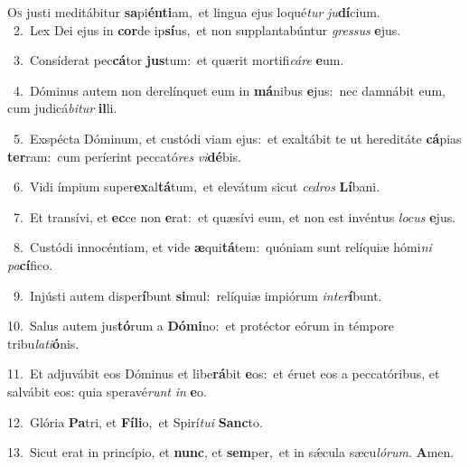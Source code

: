 \lettrine{\initial\textcolor{\initialcolor}{O}}{s} justi meditábitur \textbf{sa}\-pi\-\textbf{én}\-\textbf{ti}am,~\star et lingua ejus loqué\textit{tur} \textit{ju}\-\textbf{dí}cium.\\
{\numbfont\textcolor{\numbcolor}{~2.}}~Lex Dei ejus in \textbf{cor}\-de ip\-\textbf{sí}\-us,~\star et non supplantabúntur \textit{gres}\-\textit{sus} \textbf{e}\-jus.\par
{\numbfont\textcolor{\numbcolor}{~3.}}~Consíderat pec\-\textbf{cá}\-tor \textbf{jus}\-tum:~\star et quærit mortifi\-\textit{cá}\-\textit{re} \textbf{e}\-um.\par
{\numbfont\textcolor{\numbcolor}{~4.}}~Dóminus autem non derelínquet eum in \textbf{má}\-nibus \textbf{e}\-jus:~\star nec damnábit eum, cum judicá\-\textit{bi}\-\textit{tur} \textbf{il}\-li.\par
{\numbfont\textcolor{\numbcolor}{~5.}}~Exspécta Dóminum, et custódi viam ejus:~\dagger et exaltábit te ut hereditáte \textbf{cá}\-pias \textbf{ter}\-ram:~\star cum períerint peccató\textit{res} \textit{vi}\-\textbf{dé}bis.\par
{\numbfont\textcolor{\numbcolor}{~6.}}~Vidi ímpium super\-\textbf{ex}\-al\-\textbf{tá}\-tum,~\star et elevátum sicut \textit{ce}\-\textit{dros} \textbf{Lí}\-bani.\par
{\numbfont\textcolor{\numbcolor}{~7.}}~Et transívi, et \textbf{ec}\-ce non \textbf{e}\-rat:~\star et quæsívi eum, et non est invéntus \textit{lo}\-\textit{cus} \textbf{e}\-jus.\par
{\numbfont\textcolor{\numbcolor}{~8.}}~Custódi innocéntiam, et vide \textbf{æ}\-qui\-\textbf{tá}\-tem:~\star quóniam sunt relíquiæ hómi\textit{ni} \textit{pa}\-\textbf{cí}fico.\par
{\numbfont\textcolor{\numbcolor}{~9.}}~Injústi autem disper\-\textbf{í}\-bunt \textbf{si}\-mul:~\star relíquiæ impiórum \textit{in}\-\textit{ter}\textbf{í}bunt.\par
{\numbfont\textcolor{\numbcolor}{10.}}~Salus autem jus\-\textbf{tó}\-rum a \textbf{Dó}\-\textbf{mi}no:~\star et protéctor eórum in témpore tribu\-\textit{la}\-\textit{ti}\textbf{ó}nis.\par
{\numbfont\textcolor{\numbcolor}{11.}}~Et adjuvábit eos Dóminus et libe\-\textbf{rá}\-bit \textbf{e}\-os:~\star et éruet eos a peccatóribus, et salvábit eos: quia speravé\textit{runt} \textit{in} \textbf{e}\-o.\par
{\numbfont\textcolor{\numbcolor}{12.}}~Glória \textbf{Pa}\-tri, et \textbf{Fí}\-\textbf{li}o,~\star et Spirí\-\textit{tu}\-\textit{i} \textbf{Sanc}\-to.\par
{\numbfont\textcolor{\numbcolor}{13.}}~Sicut erat in princípio, et \textbf{nunc}\-, et \textbf{sem}\-per,~\star et in sǽcula sæcu\-\textit{ló}\-\textit{rum}. \textbf{A}\-men.\par
